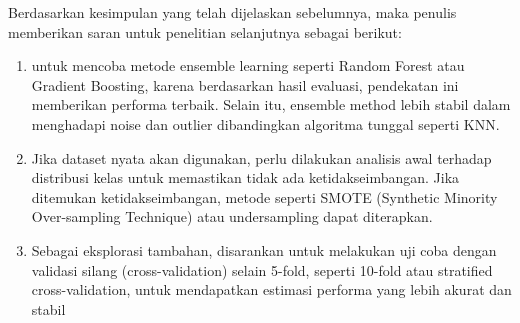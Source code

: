 \par Berdasarkan kesimpulan yang telah dijelaskan sebelumnya, maka penulis memberikan saran untuk penelitian selanjutnya sebagai berikut:
\begin{enumerate}
    \item  untuk mencoba metode ensemble learning seperti Random Forest atau Gradient Boosting, karena berdasarkan hasil evaluasi, pendekatan ini memberikan performa terbaik. Selain itu, ensemble method lebih stabil dalam menghadapi noise dan outlier dibandingkan algoritma tunggal seperti KNN.
    
    \item Jika dataset nyata akan digunakan, perlu dilakukan analisis awal terhadap distribusi kelas untuk memastikan tidak ada ketidakseimbangan. Jika ditemukan ketidakseimbangan, metode seperti SMOTE (Synthetic Minority Over-sampling Technique) atau undersampling dapat diterapkan.
    
    \item Sebagai eksplorasi tambahan, disarankan untuk melakukan uji coba dengan validasi silang (cross-validation) selain 5-fold, seperti 10-fold atau stratified cross-validation, untuk mendapatkan estimasi performa yang lebih akurat dan stabil
\end{enumerate}

